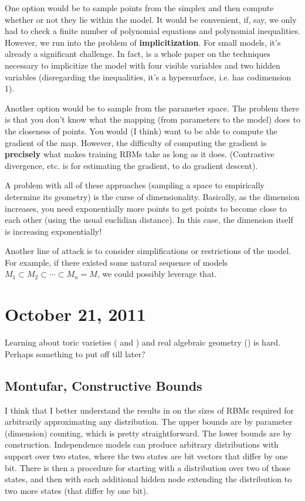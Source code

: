 \documentclass[11pt]{article}
\begin{document}
One option would be to sample points from the simplex and then compute whether
or not they lie within the model.  It would be convenient, if, say, we only had
to check a finite number of polynomial equations and polynomial inequalities.
However, we run into the problem of \textbf{implicitization}.  For small models,
it's already a significant challenge.  In fact, \cite{CTY10} is a whole paper on
the techniques necessary to implicitize the model with four visible variables
and two hidden variables (disregarding the inequalities, it's a hypersurface,
i.e. has codimension 1).

Another option would be to sample from the parameter space.  The problem there
is that you don't know what the mapping (from parameters to the model) does to
the closeness of points.  You would (I think) want to be able to compute the
gradient of the map.  However, the difficulty of computing the gradient is
\textbf{precisely} what makes training RBMs take as long as it does.
(Contrastive divergence, etc. is for estimating the gradient, to do gradient
descent).

A problem with all of these approaches (sampling a space to empirically
determine its geometry) is the curse of dimensionality.  Basically, as the
dimension increases, you need exponentially more points to get points to become
close to each other (using the usual euclidian distance).  In this case, the
dimension itself is increasing exponentially!

Another line of attack is to consider simplifications or restrictions of the
model.  For example, if there existed some natural sequence of models $M_1
\subset M_2 \subset \cdots \subset M_n = M$, we could possibly leverage that.

\section{October 21, 2011}

Learning about toric varieties (\cite{CLS09} and \cite{CLO98}) and real
algebraic geometry (\cite{Cos09}) is hard.  Perhaps something to put off till
later?

\subsection{Montufar, Constructive Bounds} 

I think that I better understand the results in \cite{Mon10} on the sizes of
RBMs required for arbitrarily approximating any distribution.  The upper bounds
are by parameter (dimension) counting, which is pretty straightforward.  The
lower bounds are by construction.  Independence models can produce arbitrary
distributions with support over two states, where the two states are bit vectors
that differ by one bit.  There is then a procedure for starting with a
distribution over two of those states, and then with each additional hidden node
extending the distribution to two more states (that differ by one bit).
\end{document}
